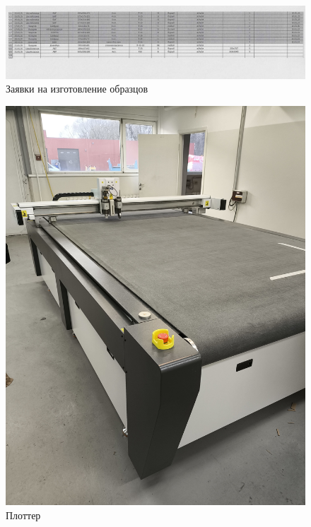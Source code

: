 \newpage
\begin{figure}
\begin{center}
 \includegraphics[height=0.16\textheight, keepaspectratio]{Pics/I.3.jpg}
\end{center}
 \caption{Заявки на изготовление образцов}
 \label{pic:I.3}
\end{figure}

\begin{figure}
\begin{center}
 \includegraphics[height=0.6\textheight, keepaspectratio]{Pics/II плоттер.jpg}
\end{center}
 \caption{Плоттер}
 \label{pic:II плоттер}
\end{figure}


